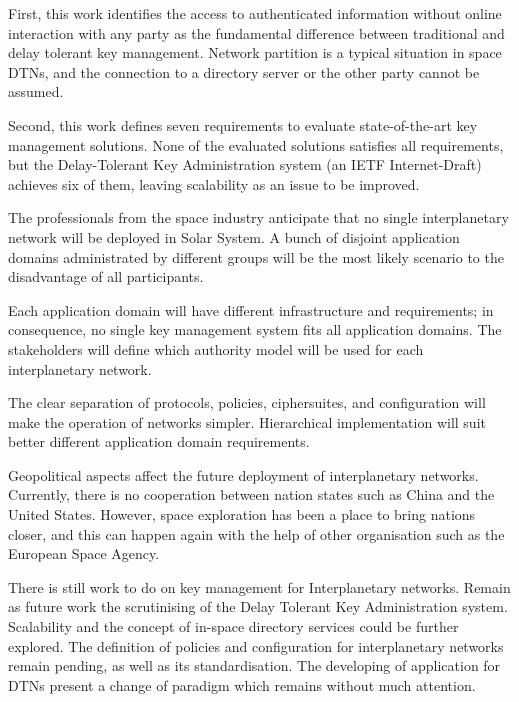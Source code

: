 First, this work identifies the access to authenticated information without online interaction with any party as the fundamental difference between traditional and delay tolerant key management. Network partition is a typical situation in space DTNs, and the connection to a directory server or the other party cannot be assumed. 



Second, this work defines seven requirements to evaluate state-of-the-art key management solutions. None of the evaluated solutions satisfies all requirements, but the Delay-Tolerant Key Administration system  (an IETF Internet-Draft) achieves six of them, leaving scalability as an issue to be improved. 

The professionals from the space industry anticipate that no single interplanetary network will be deployed in Solar System. A bunch of disjoint application domains administrated by different groups will be the most likely scenario to the disadvantage of all participants.

Each application domain will have different infrastructure and requirements; in consequence, no single key management system fits all application domains. The stakeholders will define which authority model will be used for each interplanetary network.  

The clear separation of protocols, policies, ciphersuites, and configuration will make the operation of networks simpler. Hierarchical implementation will suit better different application domain requirements.

Geopolitical aspects affect the future deployment of interplanetary networks. Currently, there is no cooperation between nation states such as China and the United States. However, space exploration has been a place to bring nations closer, and this can happen again with the help of other organisation such as the European Space Agency.


There is still work to do on key management for Interplanetary networks. Remain as future work the scrutinising of the Delay Tolerant Key Administration system. Scalability and the concept of in-space directory services could be further explored. The definition of policies and configuration for interplanetary networks remain pending, as well as its standardisation. The developing of application for DTNs present a change of paradigm which remains without much attention.


